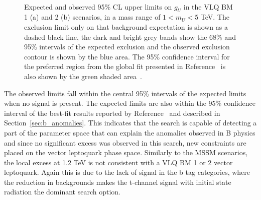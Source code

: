 \begin{figure}[!hbtp]
\centering
     \\
\caption[Plots of the model-dependent limits in the vector leptoquark phase space.]{Expected and observed 95\% CL upper limits on $g_U$ in the VLQ BM 1 (a) and 2 (b) scenarios, in a mass range of $1<m_{U}<5$ TeV.  The exclusion limit only on that background expectation is shown as a dashed black line, the dark and bright grey bands show the 68\% and 95\% intervals of the expected exclusion and the observed exclusion contour is shown by the blue area. The 95\% confidence interval for the preferred region from the global fit presented in Reference~\cite{Cornella:2021sby} is also shown by the green shaded area~\cite{CMS:2022rbd}.}
\label{fig:vlq_limits}
\end{figure}

The observed limits fall within the central 95\% intervals of the expected limits when no signal is present. 
The expected limits are also within the 95\% confidence interval of the best-fit results reported by Reference~\cite{Cornella:2021sby} and described in Section~\ref{sec:b_anomalies}.
This indicates that the search is capable of detecting a part of the parameter space that can explain the anomalies observed in B physics and since no significant excess was observed in this search, new constraints are placed on the vector leptoquark phase space.
Similarly to the \ac{MSSM} scenarios, the local excess at 1.2 TeV is not consistent with a VLQ BM 1 or 2 vector leptoquark.
Again this is due to the lack of signal in the b tag categories, where the reduction in backgrounds makes the t-channel signal with initial state radiation the dominant search option.


